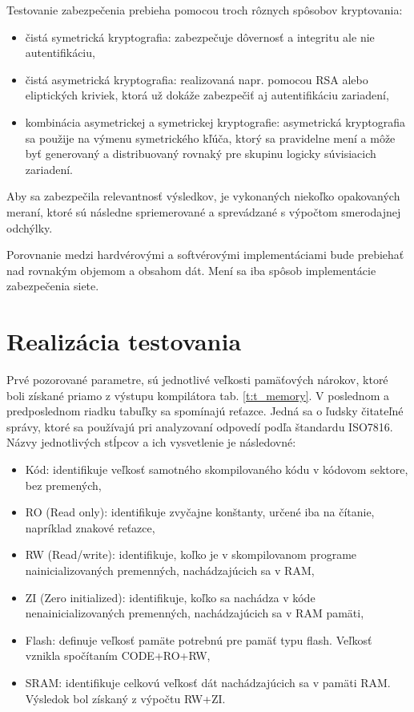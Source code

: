 \documentclass[12pt,a4paper,oneside,openright]{report}
\begin{document}
Testovanie zabezpečenia prebieha pomocou troch rôznych spôsobov kryptovania:
\singlespacing
\begin{itemize}
	\item čistá symetrická kryptografia: zabezpečuje dôvernosť a integritu ale nie autentifikáciu,
	\item čistá asymetrická kryptografia: realizovaná napr. pomocou RSA alebo eliptických kriviek, ktorá už dokáže zabezpečiť aj autentifikáciu zariadení,
	\item kombinácia asymetrickej a symetrickej kryptografie: asymetrická kryptografia sa použije na výmenu symetrického kľúča, ktorý sa pravidelne mení a môže byť generovaný a distribuovaný rovnaký pre skupinu logicky súvisiacich zariadení.
\end{itemize}
\onehalfspacing


Aby sa zabezpečila relevantnosť výsledkov, je vykonaných niekoľko opakovaných meraní, ktoré sú následne spriemerované a sprevádzané s výpočtom smerodajnej odchýlky.

Porovnanie medzi hardvérovými a softvérovými implementáciami bude prebiehať nad rovnakým objemom a obsahom dát. Mení sa iba spôsob implementácie zabezpečenia siete.

\section{Realizácia testovania}

Prvé pozorované parametre, sú jednotlivé veľkosti pamäťových nárokov, ktoré boli získané priamo z výstupu kompilátora tab. \ref{t:t_memory}. V poslednom a predposlednom riadku tabuľky sa spomínajú reťazce. Jedná sa o ľudsky čitateľné správy, ktoré sa používajú pri analyzovaní odpovedí podľa štandardu ISO7816. Názvy jednotlivých stĺpcov a ich vysvetlenie je následovné:
\begin{itemize}
	\item Kód: identifikuje veľkosť samotného skompilovaného kódu v kódovom sektore, bez premených,
	\item RO (Read only): identifikuje zvyčajne konštanty, určené iba na čítanie, napríklad znakové reťazce,
	\item RW (Read/write): identifikuje, koľko je v skompilovanom programe nainicializovaných premenných, nachádzajúcich sa v RAM,
	\item ZI (Zero initialized): identifikuje, koľko sa nachádza v kóde nenainicializovaných premenných, nachádzajúcich sa v RAM pamäti,
	\item Flash: definuje veľkosť pamäte potrebnú pre pamäť typu flash. Veľkosť vznikla spočítaním CODE+RO+RW,
	\item SRAM: identifikuje celkovú veľkosť dát nachádzajúcich sa v pamäti RAM. Výsledok bol získaný z výpočtu RW+ZI.
\end{itemize}
\onehalfspacing
\end{document}
